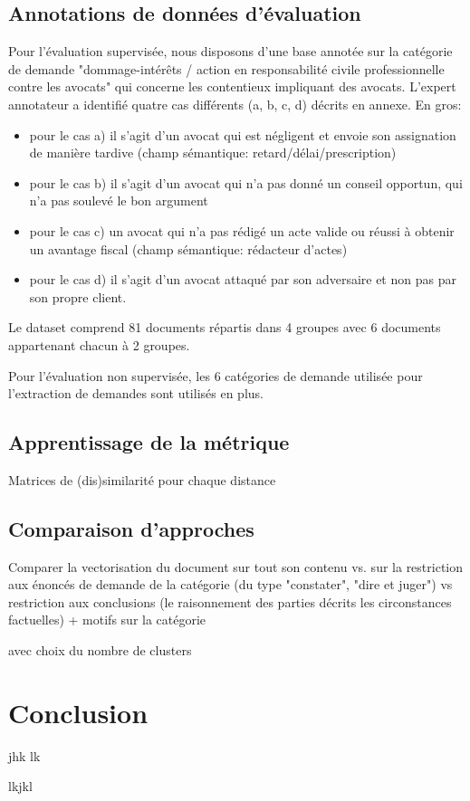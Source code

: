 \subsection{Annotations de données d'évaluation}
Pour l'évaluation supervisée, nous disposons d'une base annotée sur la catégorie de demande "dommage-intérêts / action en responsabilité civile professionnelle contre les avocats" qui concerne les contentieux impliquant des avocats.
L'expert annotateur a identifié quatre cas différents (a, b, c, d) décrits en annexe. En gros:
\begin{itemize}
\item pour le cas a) il s'agit d'un avocat qui est négligent et envoie son assignation de manière tardive (champ sémantique: retard/délai/prescription)
\item pour le cas b) il s'agit d'un avocat qui n'a pas donné un conseil opportun, qui n'a pas soulevé le bon argument
\item pour le cas c) un avocat qui n'a pas rédigé un acte valide ou réussi à obtenir un avantage fiscal (champ sémantique: rédacteur d'actes)
\item pour le cas d) il s'agit d'un avocat attaqué par son adversaire et non pas par son propre client.
\end{itemize}

Le dataset comprend 81 documents répartis dans 4 groupes avec 6 documents appartenant chacun à 2 groupes.

Pour l'évaluation non supervisée, les 6 catégories de demande utilisée pour l'extraction de demandes sont utilisés en plus.

\subsection{Apprentissage de la métrique}
Matrices de (dis)similarité pour chaque distance

\subsection{Comparaison d'approches}
Comparer la vectorisation du document sur tout son contenu vs. sur la restriction aux énoncés de demande de la catégorie (du type "constater", "dire et juger") vs restriction aux conclusions (le raisonnement des parties décrits les circonstances factuelles) + motifs sur la catégorie

avec choix du nombre de clusters


\section{Conclusion}
\label{sec:similarite:conclusion}
jhk
lk

lkjkl